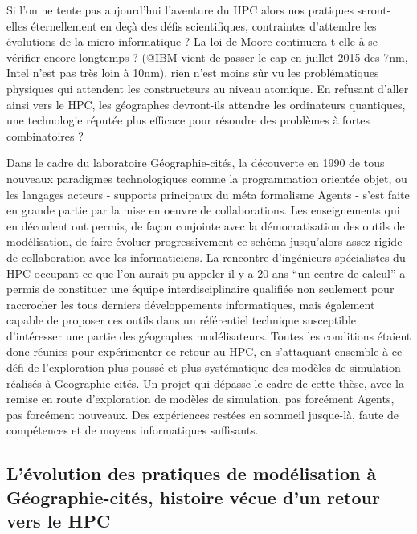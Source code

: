 Si l'on ne tente pas aujourd'hui l'aventure du HPC alors nos pratiques seront-elles éternellement en deçà des défis scientifiques, contraintes d'attendre les évolutions de la micro-informatique ? La loi de Moore continuera-t-elle à se vérifier encore longtemps ? (\href{https://www-03.ibm.com/press/us/en/pressrelease/47301.wss}{@IBM} vient de passer le cap en juillet 2015 des 7nm, Intel n'est pas très loin à 10nm), rien n'est moins sûr vu les problématiques physiques qui attendent les constructeurs au niveau atomique. En refusant d'aller ainsi vers le HPC, les géographes devront-ils attendre les ordinateurs quantiques, une technologie réputée plus efficace pour résoudre des problèmes à fortes combinatoires ?

%

Dans le cadre du laboratoire Géographie-cités, la découverte en 1990 de tous nouveaux paradigmes technologiques comme la programmation orientée objet, ou les langages acteurs - supports principaux du méta formalisme Agents - s'est faite en grande partie par la mise en oeuvre de collaborations. Les enseignements qui en découlent ont permis, de façon conjointe avec la démocratisation des outils de modélisation, de faire évoluer progressivement ce schéma jusqu'alors assez rigide de collaboration avec les informaticiens. La rencontre d'ingénieurs spécialistes du HPC occupant ce que l'on aurait pu appeler il y a 20 ans \enquote{un centre de calcul} a permis de constituer une équipe interdisciplinaire qualifiée non seulement pour raccrocher les tous derniers développements informatiques, mais également capable de proposer ces outils dans un référentiel technique susceptible d'intéresser une partie des géographes modélisateurs. Toutes les conditions étaient donc réunies pour expérimenter ce retour au HPC, en s'attaquant ensemble à ce défi de l'exploration plus poussé et plus systématique des modèles de simulation réalisés à Geographie-cités. Un projet qui dépasse le cadre de cette thèse, avec la remise en route d'exploration de modèles de simulation, pas forcément Agents, pas forcément nouveaux. Des expériences restées en sommeil jusque-là, faute de compétences et de moyens informatiques suffisants.

\subsection{L'évolution des pratiques de modélisation à Géographie-cités, histoire vécue d'un retour vers le HPC}
\label{ssec:hist_pratiques}


